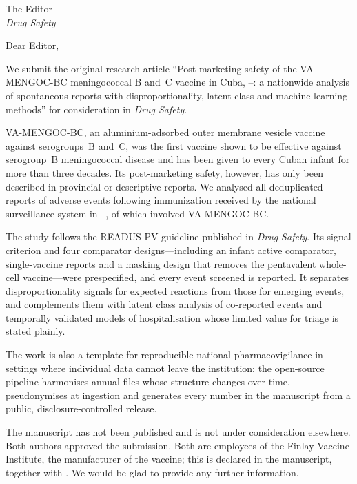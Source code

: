\documentclass[11pt]{article}
\begin{document}
\SyntheticNotice
\LetterHead
The Editor\\ \emph{Drug Safety}

Dear Editor,

We submit the original research article ``Post-marketing safety of the VA-MENGOC-BC meningococcal B
and~C vaccine in Cuba, \VStudyFirstYear--\VStudyLastYear: a nationwide analysis of spontaneous
reports with disproportionality, latent class and machine-learning methods'' for consideration in
\emph{Drug Safety}.

VA-MENGOC-BC, an aluminium-adsorbed outer membrane vesicle vaccine against serogroups~B and~C, was
the first vaccine shown to be effective against serogroup~B meningococcal disease and has been given
to every Cuban infant for more than three decades. Its post-marketing safety, however, has only been
described in provincial or descriptive reports. We analysed all \PONReports{} deduplicated reports
of adverse events following immunization received by the national surveillance system in
\VStudyFirstYear--\VStudyLastYear, of which \PONTarget{} involved VA-MENGOC-BC.

The study follows the READUS-PV guideline published in \emph{Drug Safety}. Its signal criterion
and four comparator designs---including an infant active comparator, single-vaccine reports and a
masking design that removes the pentavalent whole-cell vaccine---were prespecified, and every event
screened is reported. It separates disproportionality signals for expected reactions from those for
emerging events, and complements them with latent class analysis of co-reported events and
temporally validated models of hospitalisation whose limited value for triage is stated plainly.

The work is also a template for reproducible national pharmacovigilance in settings where
individual data cannot leave the institution: the open-source pipeline harmonises annual files whose
structure changes over time, pseudonymises at ingestion and generates every number in the
manuscript from a public, disclosure-controlled release.

The manuscript has not been published and is not under consideration elsewhere. Both authors
approved the submission. Both are employees of the Finlay Vaccine Institute, the manufacturer of the
vaccine; this is declared in the manuscript, together with .
We would be glad to provide any further information.

\LetterSignature
\end{document}
